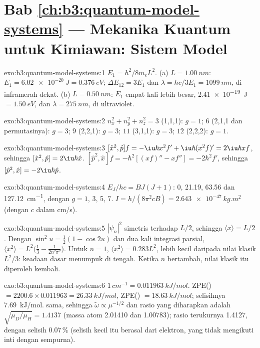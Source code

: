 \section*{Bab \ref{ch:b3:quantum-model-systems} --- Mekanika Kuantum untuk Kimiawan: Sistem Model}

\begin{solution}{exo:b3:quantum-model-systems:1}
$E_1 = h^2/8m_eL^2$. (a) $L = \qty{1.00}{nm}$: $E_1 = \qty{6.02e-20}{J} =
\qty{0.376}{eV}$; $\Delta E_{12} = 3E_1$ dan $\lambda = hc/3E_1 =
\qty{1099}{nm}$, di inframerah dekat. (b) $L = \qty{0.50}{nm}$: $E_1$ empat
kali lebih besar, \qty{2.41e-19}{J} $= \qty{1.50}{eV}$, dan $\lambda =
\qty{275}{nm}$, di ultraviolet.
\end{solution}

\begin{solution}{exo:b3:quantum-model-systems:2}
$n_x^2 + n_y^2 + n_z^2 = 3$ (1,1,1): $g = 1$; $6$ (2,1,1 dan permutasinya):
$g = 3$; $9$ (2,2,1): $g = 3$; $11$ (3,1,1): $g = 3$; $12$ (2,2,2): $g = 1$.
\end{solution}

\begin{solution}{exo:b3:quantum-model-systems:3}
$[\hat x^2,\hat p]f = -\iu\hbar x^2f' + \iu\hbar(x^2f)' = 2\iu\hbar xf$, sehingga
$[\hat x^2,\hat p] = 2\iu\hbar\hat x$. $[\hat p^2,\hat x]f = -\hbar^2[(xf)'' -
xf''] = -2\hbar^2f'$, sehingga $[\hat p^2,\hat x] = -2\iu\hbar\hat p$.
\end{solution}

\begin{solution}{exo:b3:quantum-model-systems:4}
$E_J/hc = BJ(J+1)$: 0, 21.19, 63.56 dan \qty{127.12}{cm^{-1}}, dengan $g = 1$,
3, 5, 7. $I = h/(8\pi^2cB) = \qty{2.643e-47}{kg.m^2}$ (dengan $c$ dalam
\unit{cm/s}).
\end{solution}

\begin{solution}{exo:b3:quantum-model-systems:5}
$|\psi_n|^2$ simetris terhadap $L/2$, sehingga $\langle x\rangle = L/2$. Dengan
$\sin^2u = \frac12(1 - \cos2u)$ dan dua kali integrasi parsial,
$\langle x^2\rangle = L^2\big(\frac13 - \frac{1}{2n^2\pi^2}\big)$. Untuk $n = 1$,
$\langle x^2\rangle = 0.283L^2$, lebih kecil daripada nilai klasik $L^2/3$:
keadaan dasar menumpuk di tengah. Ketika $n$ bertambah, nilai klasik itu
diperoleh kembali.
\end{solution}

\begin{solution}{exo:b3:quantum-model-systems:6}
$1\,\unit{cm^{-1}} = \qty{0.011963}{kJ/mol}$. ZPE() $= 2200.6 \times
0.011963 = \qty{26.33}{kJ/mol}$, ZPE() $= \qty{18.63}{kJ/mol}$; selisihnya
\qty{7.69}{kJ/mol}.  sama, sehingga $\tilde\omega \propto \mu^{-1/2}$
dan rasio yang diharapkan adalah $\sqrt{\mu_D/\mu_H} = 1.4137$ (massa atom
2.01410 dan 1.00783); rasio terukurnya 1.4127, dengan selisih 0.07\,\% (selisih
kecil itu berasal dari elektron, yang tidak mengikuti inti dengan sempurna).
\end{solution}

